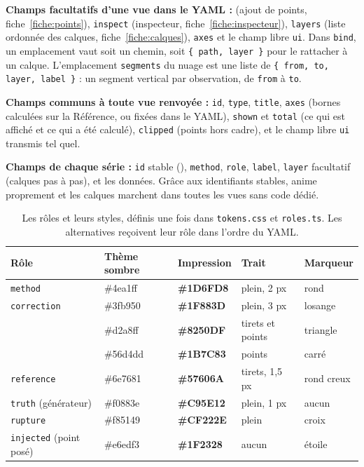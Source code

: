 \documentclass[11pt,a4paper]{article}
\begin{document}
\begin{appendices}
\textbf{Champs facultatifs d'une vue dans le YAML :}  (ajout de points, fiche~\ref{fiche:points}), \texttt{inspect} (inspecteur, fiche~\ref{fiche:inspecteur}), \texttt{layers} (liste ordonnée des calques, fiche~\ref{fiche:calques}), \texttt{axes} et le champ libre \texttt{ui}. Dans \texttt{bind}, un emplacement vaut soit un chemin, soit \texttt{\{ path, layer \}} pour le rattacher à un calque. L'emplacement \texttt{segments} du nuage est une liste de \texttt{\{ from, to, layer, label \}} : un segment vertical par observation, de \texttt{from} à \texttt{to}.

\textbf{Champs communs à toute vue renvoyée :} \texttt{id}, \texttt{type}, \texttt{title}, \texttt{axes} (bornes calculées sur la Référence, ou fixées dans le YAML), \texttt{shown} et \texttt{total} (ce qui est affiché et ce qui a été calculé), \texttt{clipped} (points hors cadre), et le champ libre \texttt{ui} transmis tel quel.

\textbf{Champs de chaque série :} \texttt{id} stable (), \texttt{method}, \texttt{role}, \texttt{label}, \texttt{layer} facultatif (calques pas à pas), et les données. Grâce aux identifiants stables,  anime proprement et les calques marchent dans toutes les vues sans code dédié.

\begin{table}[H]
  \centering
  \small
  \begin{tabularx}{\textwidth}{@{}L{3.2cm} L{2.4cm} L{2.6cm} Y L{2.2cm}@{}}
    \toprule
    \textbf{Rôle} & \textbf{Thème sombre} & \textbf{Impression} & \textbf{Trait} & \textbf{Marqueur} \\
    \midrule
    \texttt{method} & \#4ea1ff & \textcolor{ctMethod}{\textbf{\#1D6FD8}} & plein, 2 px & rond \\
    \texttt{correction} & \#3fb950 & \textcolor{ctCorrection}{\textbf{\#1F883D}} & plein, 3 px & losange \\
     & \#d2a8ff & \textcolor{ctAltOne}{\textbf{\#8250DF}} & tirets et points & triangle \\
     & \#56d4dd & \textcolor{ctAltTwo}{\textbf{\#1B7C83}} & points & carré \\
    \texttt{reference} & \#6e7681 & \textcolor{ctBaseline}{\textbf{\#57606A}} & tirets, 1,5 px & rond creux \\
    \texttt{truth} (générateur) & \#f0883e & \textcolor{ctGenerator}{\textbf{\#C95E12}} & plein, 1 px & aucun \\
    \texttt{rupture} & \#f85149 & \textcolor{ctBroken}{\textbf{\#CF222E}} & plein & croix \\
    \texttt{injected} (point posé) & \#e6edf3 & \textbf{\#1F2328} & aucun & étoile \\
    \bottomrule
  \end{tabularx}
  \caption{Les rôles et leurs styles, définis une fois dans \texttt{tokens.css} et \texttt{roles.ts}. Les alternatives reçoivent leur rôle dans l'ordre du YAML.}
\end{table}


\end{appendices}
\end{document}
